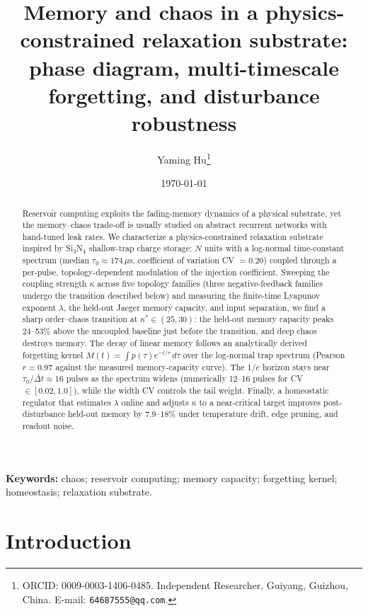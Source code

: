 \documentclass[11pt]{article}
\title{Memory and chaos in a physics-constrained relaxation substrate:
phase diagram, multi-timescale forgetting, and disturbance robustness}
\author{Yaming Hu\thanks{ORCID: 0009-0003-1406-0485. Independent
Researcher, Guiyang, Guizhou, China. E-mail:
\texttt{64687555@qq.com}.}}
\date{\today}
\begin{document}
\maketitle

\begin{abstract}
Reservoir computing exploits the fading-memory dynamics of a physical substrate,
yet the memory--chaos trade-off is usually studied on abstract recurrent networks
with hand-tuned leak rates. We characterize a physics-constrained relaxation
substrate inspired by Si$_3$N$_4$ shallow-trap charge storage: $N$ units with a
log-normal time-constant spectrum (median $\tau_0 \approx 174\,\mu$s,
coefficient of variation CV $=0.20$) coupled through a per-pulse, topology-dependent modulation of the
injection coefficient. Sweeping the coupling strength $\kappa$ across five
topology families (three negative-feedback families undergo the transition
described below) and measuring the finite-time Lyapunov exponent $\lambda$, the
held-out Jaeger memory capacity, and input separation, we find a sharp
order--chaos transition at $\kappa^\ast \in (25,30)$: the held-out memory
capacity peaks 24--53\% above the uncoupled baseline just before the
transition, and deep chaos destroys memory. The decay of linear memory follows
an analytically derived forgetting kernel $M(t)=\int p(\tau)e^{-t/\tau}\,d\tau$
over the log-normal trap spectrum (Pearson $r=0.97$ against the measured
memory-capacity curve). The $1/e$ horizon stays near
$\tau_0/\bar{\Delta t}\approx 16$ pulses as the spectrum widens (numerically
12--16 pulses for CV $\in[0.02,1.0]$), while the width CV controls the tail
weight. Finally, a homeostatic regulator that
estimates $\lambda$ online and adjusts $\kappa$ to a near-critical target
improves post-disturbance held-out memory by 7.9--18\% under temperature drift,
edge pruning, and readout noise.
\end{abstract}

\noindent\textbf{Keywords:} chaos; reservoir computing; memory capacity;
forgetting kernel; homeostasis; relaxation substrate.

\section{Introduction}
\label{sec:intro}
\end{document}
